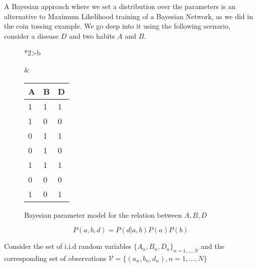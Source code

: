 A Bayesian approach where we set a distribution over the parameters is an
alternative to Maximum Likelihood training of a Bayesian Network, as we did in
the coin tossing example. We go deep into it using the following scenario, consider a disease
\(D\) and two habits \(A\) and \(B\).

\begin{figure}[!ht]
  \begin{tabular}{*{2}{>{\centering\arraybackslash}b{}}}
  \centering
  \begin{tikzpicture}[
    node distance=1cm and 0.5cm,
    mynode/.style={draw,circle,text width=0.5cm,align=center}
    ]

    \node[mynode] (d) {\(D_{n}\)};
    \node[mynode, above left=of d] (a) {\(A_{n}\)};
    \node[mynode, above right=of d] (b) {\(B_{n}\)};
    \node[mynode, above=of a] (ta) {\(\theta_{A}\)};
    \node[mynode, above=of b] (tb) {\(\theta_{B}\)};
    \node[mynode, below=of d] (td) {\(\theta_{D}\)};
    \plate{} {(d)(a)(b)} {\(1\dots N\)}; %
    \path (a) edge[-latex] (d)
    (b) edge[-latex] (d)
    (ta) edge[-latex] (a)
    (tb) edge[-latex] (b)
    (td) edge[-latex] (d)
    ;

  \end{tikzpicture}
    \caption{Bayesian parameter model for the relation between \(A,B,D\)}
    \label{fig:bayesian_example}
    &
      \renewcommand{\arraystretch}{1.3}
      \begin{tabular}{|l|l|l|}
    \hline
    A & B & D \\ \hline
    1 & 1 & 1 \\ \hline
    1 & 0 & 0 \\ \hline
    0 & 1 & 1 \\ \hline
    0 & 1 & 0 \\ \hline
    1 & 1 & 1 \\ \hline
    0 & 0 & 0 \\ \hline
    1 & 0 & 1 \\ \hline
  \end{tabular}
\end{tabular}
    \end{figure}



\[
P(a,b,d) = P(d|a,b)P(a)P(b)
\]

Consider the set of i.i.d random variables
\(\{A_{n}, B_{n}, D_{n}\}_{n = 1,\dots, N}\) and the
corresponding set of observations
\(\mathcal{V} = \{(a_{n}, b_{n}, d_{n}), n = 1,\dots , N\}\)

